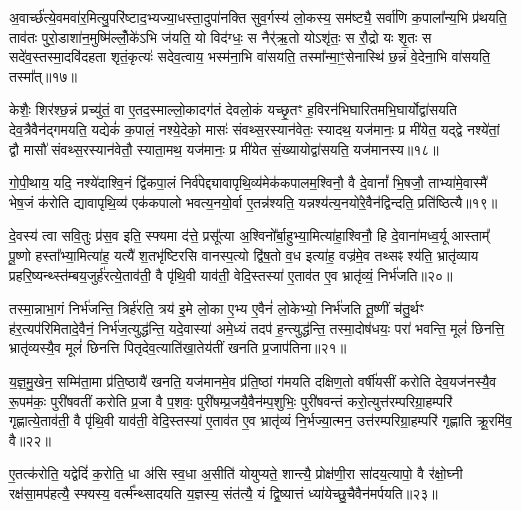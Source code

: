 अ॒वार्च्छ॑त्ये॒वमवा॑र॒मित्यु॒परि॑ष्टाद॒भ्यज्या॒धस्ता॒दुपा॑नक्ति सुव॒र्गस्य॑ लो॒कस्य॒ सम॑ष्ट्यै॒ सर्वा॑णि क॒पाला᳚न्य॒भि प्र॑थयति॒ ताव॑तः पुरो॒डाशा॑न॒मुष्मि॑ल्लोँ॒के॑\-ऽभि ज॑यति॒ यो विद॑ग्धः॒ स नैर्\mbox{}॑ऋ॒तो यो\-ऽशृ॑तः॒ स रौ॒द्रो यः शृ॒तः स सदे॑व॒स्तस्मा॒दवि॑दहता शृतं॒कृत्यः॑ सदेव॒त्वाय॒ भस्म॑ना॒भि वा॑सयति॒ तस्मा᳚न्मा॒ꣳ॒सेनास्थि॑ छ॒न्नं वे॒देना॒भि वा॑सयति॒ तस्मा᳚त्॥१७॥

केशैः॒ शिर॑श्छ॒न्नं प्रच्यु॑तं॒ वा ए॒तद॒स्माल्लो॒कादग॑तं देवलो॒कं यच्छृ॒तꣳ ह॒विरन॑भिघारितमभि॒घार्योद्वा॑सयति देव॒त्रैवैन॑द्गमयति॒ यद्येकं॑ क॒पालं॒ नश्ये॒देको॒ मासः॑ संवथ्स॒रस्यान॑वेतः॒ स्यादथ॒ यज॑मानः॒ प्र मी॑येत॒ यद्द्वे नश्ये॑तां॒ द्वौ मासौ॑ संवथ्स॒रस्यान॑वेतौ॒ स्याता॒मथ॒ यज॑मानः॒ प्र मी॑येत सं॒ख्यायोद्वा॑सयति॒ यज॑मानस्य॥१८॥

गो॒पी॒थाय॒ यदि॒ नश्ये॑दाश्वि॒नं द्वि॑कपा॒लं निर्व॑पेद्द्यावापृथि॒व्य॑मेक॑कपालम॒श्विनौ॒ वै दे॒वानां᳚ भि॒षजौ॒ ताभ्या॑मे॒वास्मै॑ भेष॒जं क॑रोति द्यावापृथि॒व्य॑ एक॑कपालो भवत्य॒नयो॒र्वा ए॒तन्न॑श्यति॒ यन्नश्य॑त्य॒नयो॑रे॒वैन॑द्विन्दति॒ प्रति॑ष्ठित्यै॥१९॥

{\anuvakamend[{प्रा॒जा॒प॒त्यन्ते\-ऽक्षो\-ऽनु॑पाक्तो वे॒देना॒भि वा॑सयति॒ तस्मा॒द्यज॑मानस्य॒ द्वात्रिꣳ॑शच्च॥३॥}]}

दे॒वस्य॑ त्वा सवि॒तुः प्र॑स॒व इति॒ स्फ्यमा द॑त्ते॒ प्रसू᳚त्या अ॒श्विनो᳚र्बा॒हुभ्या॒मित्या॑हा॒श्विनौ॒ हि दे॒वाना॑मध्व॒र्यू आस्ताम्᳚ पू॒ष्णो हस्ता᳚भ्या॒मित्या॑ह॒ यत्यै॑ श॒तभृ॑ष्टिरसि वानस्प॒त्यो द्वि॑ष॒तो व॒ध इत्या॑ह॒ वज्र॑मे॒व तथ्सꣴ श्य॑ति॒ भ्रातृ॑व्याय प्रहरि॒ष्यन्थ्स्त॑म्बय॒जुर्\mbox{}ह॑रत्ये॒ताव॑ती॒ वै पृ॑थि॒वी याव॑ती॒ वेदि॒स्तस्या॑ ए॒ताव॑त ए॒व भ्रातृ॑व्यं॒ निर्भ॑जति॥२०॥

तस्मा॒न्नाभा॒गं निर्भ॑जन्ति॒ त्रिर्\mbox{}ह॑रति॒ त्रय॑ इ॒मे लो॒का ए॒भ्य ए॒वैनं॑ लो॒केभ्यो॒ निर्भ॑जति तू॒ष्णीं च॑तु॒र्थꣳ ह॑र॒त्यप॑रिमितादे॒वैनं॒ निर्भ॑ज॒त्युद्ध॑न्ति॒ यदे॒वास्या॑ अमे॒ध्यं तदप॑ ह॒न्त्युद्ध॑न्ति॒ तस्मा॒दोष॑धयः॒ परा॑ भवन्ति॒ मूलं॑ छिनत्ति॒ भ्रातृ॑व्यस्यै॒व मूलं॑ छिनत्ति पितृदेव॒त्याति॑खा॒तेय॑तीं खनति प्र॒जाप॑तिना॥२१॥

य॒ज्ञ॒मु॒खेन॒ सम्मि॑ता॒मा प्र॑ति॒ष्ठायै॑ खनति॒ यज॑मानमे॒व प्र॑ति॒ष्ठां ग॑मयति दक्षिण॒तो वर्\mbox{}षी॑यसीं करोति देव॒यज॑नस्यै॒व रू॒पम॑कः॒ पुरी॑षवतीं करोति प्र॒जा वै प॒शवः॒ पुरी॑षम्प्र॒जयै॒वैन॑म्प॒शुभिः॒ पुरी॑षवन्तं करो॒त्युत्त॑रम्परिग्रा॒हम्परि॑ गृह्णात्ये॒ताव॑ती॒ वै पृ॑थि॒वी याव॑ती॒ वेदि॒स्तस्या॑ ए॒ताव॑त ए॒व भ्रातृ॑व्यं नि॒र्भज्या॒त्मन॒ उत्त॑रम्परिग्रा॒हम्परि॑ गृह्णाति क्रू॒रमि॑व॒ वै॥२२॥

ए॒तत्क॑रोति॒ यद्वेदिं॑ क॒रोति॒ धा अ॑सि स्व॒धा अ॒सीति॑ योयुप्यते॒ शान्त्यै॒ प्रोक्ष॑णी॒रा सा॑दय॒त्यापो॒ वै र॑क्षो॒घ्नी रक्ष॑सा॒मप॑हत्यै॒ स्फ्यस्य॒ वर्त्म᳚न्थ्सादयति य॒ज्ञस्य॒ संत॑त्यै॒ यं द्वि॒ष्यात्तं ध्या॑येच्छु॒चैवैन॑मर्पयति॥२३॥

